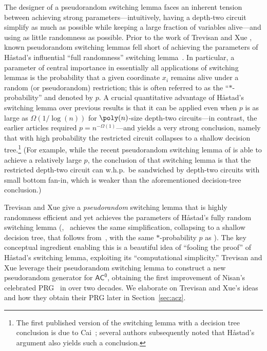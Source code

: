 \documentclass{toc}
\theoremstyle{plain}
\newcommand{\acz}{\mathsf{AC^0}}
\begin{document}
The designer of a pseudorandom switching lemma faces an inherent tension between achieving strong parameters---intuitively, having a depth-two circuit simplify as much as possible while keeping a large fraction of variables alive---and using as little randomness as possible.  Prior to the work of Trevisan and Xue \cite{TX13}, known pseudorandom switching lemmas fell short of achieving the parameters of H{\aa}stad's influential ``full randomness'' switching lemma~\cite{Hastad86}.  In particular, a parameter of central importance in essentially all applications of switching lemmas is the probability that a given coordinate $x_i$ remains alive under a random (or pseudorandom) restriction; this is often referred to as the ``$\ast$-probability'' and denoted by $p$.  
A crucial quantitative advantage of H{\aa}stad's switching lemma over previous
%
results %
is that it can be applied even when $p$ is as large as $\Omega(1/\log(n))$ for $\poly(n)$-size depth-two circuits---in contrast, the earlier 
%
articles %
\cite{ajtai1983,FSS:84,yao1985} required $p=n^{-\Omega(1)}$---and yields a very strong conclusion, namely that with high probability the restricted circuit collapses to a shallow decision tree.\footnote{The first published version of the switching lemma with a decision tree conclusion is due to Cai~\cite{Cai86}; several authors subsequently noted that H{\aa}stad's argument also yields such a conclusion.} %
(For example, while the recent pseudorandom switching lemma of \cite{GMR13} is able to achieve a relatively large $p$, the conclusion of that switching lemma is that the restricted depth-two circuit can w.h.p.~be sandwiched by depth-two circuits with small bottom fan-in, which is weaker than the aforementioned %
decision-tree conclusion.)  %

Trevisan and Xue \cite{TX13} give a \emph{pseudorandom} switching lemma that is highly randomness efficient and yet achieves the parameters of H{\aa}stad's fully random switching lemma (\ie,~\cite{TX13} achieves the same simplification, collapsing to a shallow decision tree, that follows from~\cite{Hastad86}, with the same $\ast$-probability $p$ as \cite{Hastad86}).  The key conceptual ingredient enabling this is a beautiful idea of ``fooling the proof'' of  H{\aa}stad's switching lemma, exploiting its ``computational simplicity.''  Trevisan and Xue leverage their pseudorandom switching lemma to construct a new pseudorandom generator for $\acz$, obtaining the first improvement of Nisan's celebrated PRG~\cite{Nis91} in over two decades. We elaborate on Trevisan and Xue's ideas and how they obtain their PRG later in Section~\ref{sec:acz}.
\end{document}

